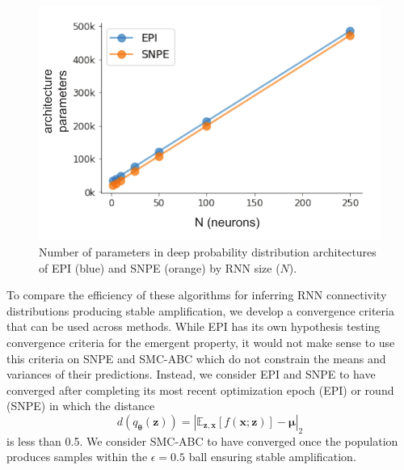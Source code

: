 \documentclass[11pt]{article}
\begin{document}
\begin{figure}
\begin{center}
\includegraphics[scale=0.7]{figures/figRNN1/figRNN1.pdf}
\end{center}
\caption{Number of parameters in deep probability distribution architectures of EPI (blue) and SNPE (orange) by RNN size ($N$).
}
\label{fig:RNN1}
\end{figure}

To compare the efficiency of these algorithms for inferring RNN connectivity distributions producing stable amplification, we develop a convergence criteria that can be used across methods.
While EPI has its own hypothesis testing convergence criteria for the emergent property, it would not make sense to use this criteria on SNPE and SMC-ABC which do not constrain the means and variances of their predictions.
Instead, we consider EPI and SNPE to have converged after completing its most recent optimization epoch (EPI) or round (SNPE) in which the distance
\begin{equation}
d(q_{\bm{\theta}}(\mathbf{z})) = |\mathbb{E}_{\mathbf{z}, \mathbf{x}} \left[f(\mathbf{x}; \mathbf{z}) \right] - \bm{\mu}|_2
\end{equation}
is less than 0.5.
We consider SMC-ABC to have converged once the population produces samples within the $\epsilon = 0.5$ ball ensuring stable amplification.
\end{document}
